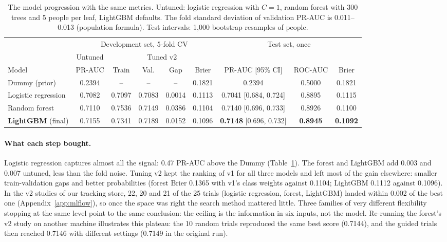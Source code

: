 \documentclass[11pt,a4paper]{article}
\begin{document}
\begin{table}[H]
\centering\small\setlength{\tabcolsep}{4pt}
\begin{tabular}{@{}lccccc|ccc@{}}
\toprule
& \multicolumn{5}{c|}{Development set, 5-fold CV} & \multicolumn{3}{c}{Test set, once} \\
& Untuned & \multicolumn{4}{c|}{Tuned v2} & & & \\
\cmidrule(lr){2-2}\cmidrule(lr){3-6}
Model & PR-AUC & Train & Val. & Gap & Brier & PR-AUC [95\% CI] & ROC-AUC & Brier \\
\midrule
Dummy (prior) & 0.2394 & -- & -- & -- & 0.1821 & 0.2394 & 0.5000 & 0.1821 \\
Logistic regression & 0.7082 & 0.7097 & 0.7083 & 0.0014 & 0.1113 & 0.7041 [0.684, 0.724] & 0.8895 & 0.1115 \\
Random forest & 0.7110 & 0.7536 & 0.7149 & 0.0386 & 0.1104 & 0.7140 [0.696, 0.733] & 0.8926 & 0.1100 \\
\textbf{LightGBM} (final) & 0.7155 & 0.7341 & 0.7189 & 0.0152 & 0.1096 & \textbf{0.7148} [0.696, 0.732] & \textbf{0.8945} & \textbf{0.1092} \\
\bottomrule
\end{tabular}
\caption{The model progression with the same metrics. Untuned: logistic regression with $C=1$, random forest with 300 trees and 5 people per leaf, LightGBM defaults. The fold standard deviation of validation PR-AUC is 0.011--0.013 (population formula). Test intervals: 1{,}000 bootstrap resamples of people.}
\label{tab:models}
\end{table}

\paragraph{What each step bought.} Logistic regression captures almost all the signal: 0.47 PR-AUC above the Dummy (Table~\ref{tab:models}). The forest and LightGBM add 0.003 and 0.007 untuned, less than the fold noise. Tuning v2 kept the ranking of v1 for all three models and left most of the gain elsewhere: smaller train-validation gaps and better probabilities (forest Brier 0.1365 with v1's class weights against 0.1104; LightGBM 0.1112 against 0.1096). In the v2 studies of our tracking store, 22, 20 and 21 of the 25 trials (logistic regression, forest, LightGBM) landed within 0.002 of the best one (Appendix~\ref{app:mlflow}), so once the space was right the search method mattered little. Three families of very different flexibility stopping at the same level point to the same conclusion: the ceiling is the information in six inputs, not the model. Re-running the forest's v2 study on another machine illustrates this plateau: the 10 random trials reproduced the same best score (0.7144), and the guided trials then reached 0.7146 with different settings (0.7149 in the original run).
\end{document}
